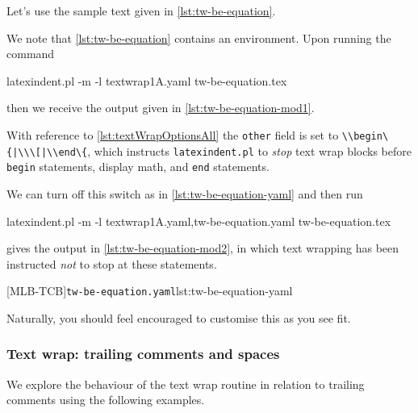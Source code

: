  \begin{example}
 Let's use the sample text given in \cref{lst:tw-be-equation}.  


 We note that \cref{lst:tw-be-equation} contains an environment. Upon running the command
 \begin{commandshell}
latexindent.pl -m -l textwrap1A.yaml tw-be-equation.tex
\end{commandshell}
 then we receive the output given in \cref{lst:tw-be-equation-mod1}.


 With reference to \vref{lst:textWrapOptionsAll} the \texttt{other} field is set to
 \lstinline!\\begin\{|\\\[|\\end\{!, which instructs \texttt{latexindent.pl} to
 \emph{stop} text wrap blocks before \texttt{begin} statements, display math, and
 \texttt{end} statements.

 We can turn off this switch as in \cref{lst:tw-be-equation-yaml} and then run
 \begin{widepage}
  \begin{commandshell}
latexindent.pl -m -l textwrap1A.yaml,tw-be-equation.yaml tw-be-equation.tex
\end{commandshell}
 \end{widepage}
 gives the output in \cref{lst:tw-be-equation-mod2}, in which text wrapping has been
 instructed \emph{not} to stop at these statements.

 [MLB-TCB]{\texttt{tw-be-equation.yaml}}{lst:tw-be-equation-yaml}

 \begin{widepage}
 \end{widepage}

 Naturally, you should feel encouraged to customise this as you see fit.
 \end{example}

\subsubsection{Text wrap: trailing comments and spaces}
 We explore the behaviour of the text wrap routine in relation to trailing comments using
 the following examples.

